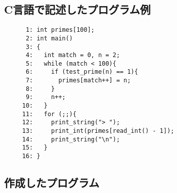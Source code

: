 \documentclass[a4j,11pt]{jarticle}
\begin{document}
\subsection{C言語で記述したプログラム例}

\begin{verbatim}
      1: int primes[100];
      2: int main()
      3: {
      4:   int match = 0, n = 2;
      5:   while (match < 100){
      6:     if (test_prime(n) == 1){
      7:       primes[match++] = n;
      8:     }
      9:     n++;
     10:   }
     11:   for (;;){
     12:     print_string("> ");
     13:     print_int(primes[read_int() - 1]);
     14:     print_string("\n");
     15:   }
     16: }
\end{verbatim}

\subsection{作成したプログラム}
\end{document}
